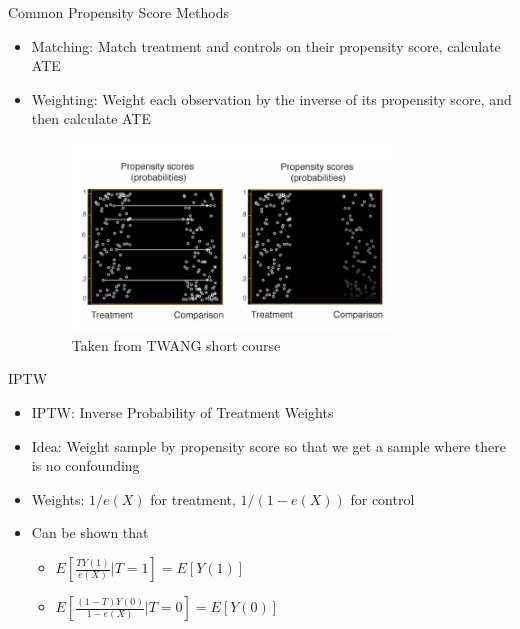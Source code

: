 \begin{frame}{Common Propensity Score Methods}
\begin{itemize}
 \item Matching: Match treatment and controls on their propensity score, calculate ATE
 \item Weighting: Weight each observation by the inverse of its propensity score, and then calculate ATE
 
  \begin{figure}[h!]
  \centering
    \includegraphics[width=0.8\textwidth]{ps_examples.png}
    \caption{Taken from TWANG short course \cite{Rand2015}}
\label{fig:psexamp}

\end{figure}
\end{itemize}


\end{frame}

\begin{frame}{IPTW}
\begin{itemize}
\item IPTW: Inverse Probability of Treatment Weights
\item Idea: Weight sample by propensity score so that we get a sample where there is no confounding
\item Weights: $1/e(X)$ for treatment, $1/(1-e(X))$ for control
\item Can be shown that 
\begin{itemize}
 \item $E[\frac{TY(1)}{e(X)}|T=1]=E[Y(1)]$
 \item $E[\frac{(1-T)Y(0)}{1-e(X)}|T=0]=E[Y(0)]$
\end{itemize}
 
\end{itemize}

\end{frame}


